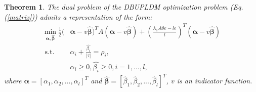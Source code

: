 \documentclass[a4paper]{cas-sc}
\newtheorem{myTheo}{Theorem}
\begin{document}
\begin{myTheo}
\label{theo2}
The dual problem of the DBUPLDM optimization problem (Eq. (\ref{matrix})) admits a representation of the form: 
\begin{equation}
\label{dual}
\begin{aligned}
\min _{\boldsymbol{\alpha, \hat{\beta}}} \frac{1}{2}( & \boldsymbol{\alpha}-v \boldsymbol{\hat{\beta}})^{T} A(\boldsymbol{\alpha}-v \boldsymbol{\hat{\beta}})+\left(\frac{\lambda_{1} A\mathbb{\theta}e-l e}{l}\right)^{T}(\boldsymbol{\alpha}-v \boldsymbol{\hat{\beta}}) \\
\text { s.t. } \quad & \alpha_{i}+\frac{\hat{\beta_{i}}}{|\tau|}=\rho_{i}, \\
& \alpha_{i} \geq 0, \hat{\beta_{i}} \geq 0, i=1, \ldots, l,
\end{aligned}
\end{equation}
where $\boldsymbol{\alpha}=[\alpha_{1},\alpha_{2},...,\alpha_{l}]^{T}$ and $\boldsymbol{\hat{\beta}}=[\hat{\beta}_{1},\hat{\beta}_{2},...,\hat{\beta}_{l}]^{T}$, $v$ is an indicator function.
\end{myTheo}
\end{document}
